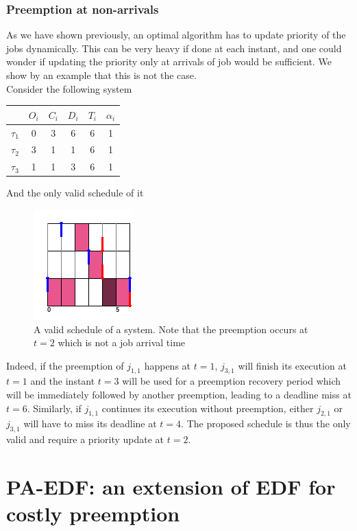 \documentclass[a4paper,10pt]{article}
\begin{document}
        \subsubsection{Preemption at non-arrivals}

        As we have shown previously, an optimal algorithm has to update priority of the jobs dynamically. This can be very heavy if done at each instant, and one could wonder if updating the priority only at arrivals of job would be sufficient. We show by an example that this is not the case.\\

        Consider the following system

        \begin{center}
            \begin{tabular}{|r|c|c|c|c|c|}
                \hline
                            & $O_i$ & $C_i$ & $D_i$ & $T_i$ & $\alpha_i$ \\ \hline
                $\tau_1$    & 0     & 3     & 6    & 6     & 1     \\ \hline
                $\tau_2$    & 3     & 1     & 1    & 6     & 1     \\ \hline
                $\tau_3$    & 1     & 1     & 3    & 6     & 1     \\ \hline
            \end{tabular}
        \end{center}

        And the only valid schedule of it

        \begin{figure}[H]
        \begin{center}
            \includegraphics[scale=0.7]{figs/mpana.png}
            \caption{A valid schedule of a system. Note that the preemption occurs at $t=2$ which is not a job arrival time}
            \label{fig:mpana}
        \end{center}
        \end{figure}

        Indeed, if the preemption of $j_{1,1}$ happens at $t=1$, $j_{3,1}$ will finish its execution at $t=1$ and the instant $t=3$ will be used for a preemption recovery period which will be immediately followed by another preemption, leading to a deadline miss at $t=6$. Similarly, if $j_{1,1}$ continues its execution without preemption, either $j_{2,1}$ or $j_{3,1}$ will have to miss its deadline at $t=4$. The proposed schedule is thus the only valid and require a priority update at $t=2$.

\section{PA-EDF: an extension of EDF for costly preemption}



\nocite{*}


\end{document}
